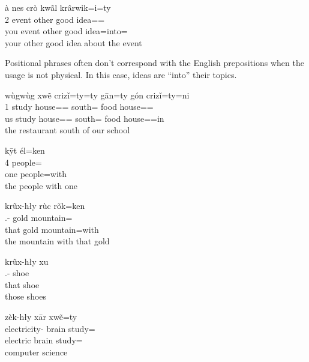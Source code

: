 \documentclass[12pt]{article}
\begin{document}
    \begin{exe}
        \ex
        \glll
        à nes crò kwãl krârwik=i=ty \\
        2\Sg{} event other good idea=\IllThree{}=\Poss{} \\
        you event other good idea=into=\Poss{} \\
        \glt
        your other good idea about the event
    \end{exe}
    Positional phrases often don't correspond with the English prepositions
    when the usage is not physical.
    In this case, ideas are ``into'' their topics.

    \begin{exe}
        \ex
        \glll
        wùgwùg xwẽ crizǐ=ty=ty gān=ty gón crizǐ=ty=ni \\
        1\Pl{} study house=\Poss{}=\Poss{} south=\Poss{} food house=\Poss{}=\InessTwo{} \\
        us study house=\Poss{}=\Poss{} south=\Poss{} food house=\Poss{}=in \\
        \glt
        the restaurant south of our school
    \end{exe}

    \begin{exe}
        \ex
        \glll
        kȳt él=ken \\
        4\Sg{} people=\Com{} \\
        one people=with \\
        \glt
        the people with one
    \end{exe}

    \begin{exe}
        \ex
        \glll
        krũx-hły rùc rõk=ken \\
        \Dem{}.\Dist{}-\Adj{} gold mountain=\Com{} \\
        that gold mountain=with \\
        \glt
        the mountain with that gold
    \end{exe}

    \begin{exe}
        \ex
        \glll
        krũx-hły xu \\
        \Dem{}.\Dist{}-\Adj{} shoe \\
        that shoe \\
        \glt
        those shoes
    \end{exe}

    \begin{exe}
        \ex
        \glll
        zèk-hły xār xwẽ=ty \\
        electricity-\Adj{} brain study=\Poss{} \\
        electric brain study=\Poss{} \\
        \glt
        computer science
    \end{exe}
\end{document}
